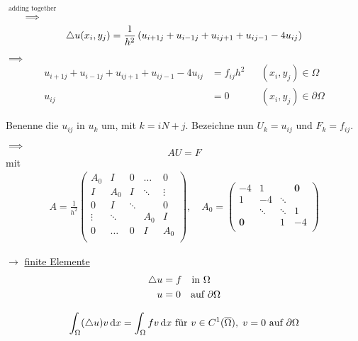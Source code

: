 $\stackrel{\text{adding together}}{\implies}$
\begin{equation*}
	\mathop{}\!\mathbin\bigtriangleup u(x_i,y_j) = \frac{1}{h^2} \left( u_{i+1 j} + u_{i-1 j} + u_{i j+1} + u_{i j-1} - 4u_{i j} \right)
\end{equation*}

$\implies$
\begin{align*}
	 u_{i+1 j} + u_{i-1 j} + u_{i j+1} + u_{i j-1} - 4u_{i j} &= f_{i j}h^2 & & (x_i,y_j) \in \Omega\\
	 u_{i j} &= 0 & & (x_i,y_j) \in \partial\Omega 
\end{align*}

Benenne die $u_{ij}$ in $u_k$ um, mit $k = iN+j$. Bezeichne nun $U_k = u_{ij}$ und $F_k = f_{ij} $.

$\implies$
\begin{equation*}
	AU = F 
\end{equation*}
mit 
\begin{align*}
	A = \frac{1}{h^2}
	\begin{pmatrix}
	A_0       & I        & 0		&\dots  & 0     \\
	I		  & A_0 	 & I 		&\ddots & \vdots\\
	0		  & I        & \ddots 	&		& 0     \\
	\vdots    & \ddots   & 		  	& A_0	&	I   \\
	0		  & \dots 	 & 0  		& I 	& A_0   \\
	\end{pmatrix}, 
	\quad
	A_0 = 
	\begin{pmatrix}
	-4    		& 1      & 		  & \textbf{0}  \\
	1	  		& -4 	 & \ddots & 			\\
		  		& \ddots & \ddots &	1   \\
	\textbf{0}	& 	     & 1 	  & -4   \\
	\end{pmatrix}
\end{align*}


$\rightarrow$ \underline{finite Elemente}\enter
\enter
\begin{align*}
  \mathop{}\!\mathbin\bigtriangleup u &= f \quad  \text{in}\  \Omega\\
  u &= 0 \quad \text{auf}\ \partial\Omega
\end{align*}

\begin{equation*}
	\int_\Omega (\mathop{}\!\mathbin\bigtriangleup u) v \mathop{}\!\mathrm{d} x = \int_\Omega fv \mathop{}\!\mathrm{d} x \text { f\"ur } v\in C^1(\overline{\Omega}), \; v=0 \text{ auf } \partial \Omega
\end{equation*}

